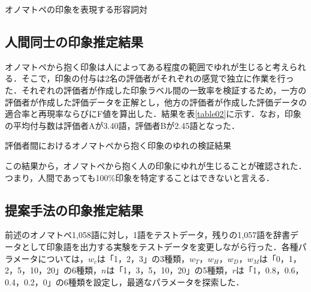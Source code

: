 \documentclass[japanese]{jnlp_1.4}
\newcommand{\addtext}[1]{}
\begin{document}
\begin{table}[b]
\caption{オノマトペの印象を表現する形容詞対}
\label{table01}

\end{table}



\subsection{人間同士の印象推定結果}\label{re}

オノマトペから抱く印象は人によってある程度の範囲でゆれが生じると考えられる．そこで，印象の付与は2名の評価者がそれぞれの感覚で独立に作業を行った．\addtext{なお，表{\ref{table01}}の左上から右下の順に横方向に5対ずつ並べてディスプレイに表示させた形容詞対とオノマトペ辞書の見出し語のみを参照しながら印象の付与作業を行った．}それぞれの評価者が作成した印象ラベル間の一致率を検証するため，一方の評価者が作成した評価データを正解とし，他方の評価者が作成した評価データの適合率と再現率ならびにF値を算出した．結果を表\ref{table02}に示す．なお，印象の平均付与数は評価者Aが3.40語，評価者Bが2.45語となった．\addtext{また，各形容詞ごとに「その形容詞が選択されたか否か」という2カテゴリ選択問題として人間同士の回答のカッパ係数を求めたところ，最大で0.602，最小で$-0.006$であり，48形容詞の平均で0.332であった．}


\begin{table}[b]
\caption{評価者間におけるオノマトペから抱く印象のゆれの検証結果}
\label{table02}

\end{table}

この結果から，オノマトペから抱く人の印象にゆれが生じることが確認された．つまり，人間であっても100\%印象を特定することはできないと言える．\addtext{この結果は2名の評価者だけからの結果であるため，あくまでも参考程度の値ではあるが，本論文では，人間同士の一致率にあたるF値0.427を提案方法の性能評価を行う際の目安として用いることとする．}



\subsection{提案手法の印象推定結果}

前述のオノマトペ1,058語に対し，1語をテストデータ，残りの1,057語を辞書データとして印象語を出力する実験をテストデータを変更しながら行った．各種パラメータについては，$w_{c}$は「1，2，3」の3種類，$w_{T}$，$w_{H}$，$w_{D}$，$w_{M}$は「0，1，2，5，10，20」の6種類，$n$は「1，3，5，10，20」の5種類，$r$は「1，0.8，0.6，0.4，0.2，0」の6種類を設定し，最適なパラメータを探索した．
\end{document}
